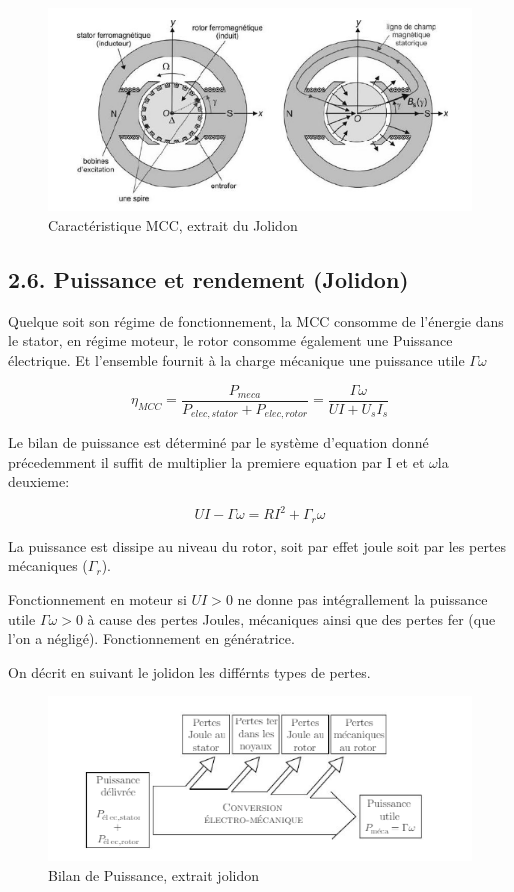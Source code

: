 \documentclass[french, a4paper, 10pt, twocolumn, landscape]{article}
\begin{document}
\begin{figure}[ht]
	\centering
  \includegraphics[width=.5\linewidth]{./figures/MCC.png}
	\caption{Caractéristique MCC, extrait du Jolidon}
\end{figure}


\subsection*{2.6. Puissance et rendement (Jolidon)}

Quelque soit son régime de fonctionnement, la MCC consomme de l'énergie dans le stator, en régime moteur, le rotor consomme également une Puissance électrique. Et l'ensemble fournit à la charge mécanique une puissance utile $\Gamma\omega$




\begin{equation}
	\eta_{MCC} = \dfrac{P_{meca}}{P_{elec, stator}+P_{elec,rotor}}
=\dfrac{\Gamma\omega}{UI+U_sI_s}\end{equation}


Le bilan de puissance est déterminé par le système d'equation donné précedemment il suffit de multiplier la premiere equation par I et et $\omega$la deuxieme: 


\begin{equation}
	UI-\Gamma\omega = RI^2+\Gamma_r\omega
\end{equation}

La puissance est dissipe au niveau du rotor, soit par effet joule soit par les pertes mécaniques ($\Gamma_r$). 

Fonctionnement en moteur si $UI>0$ ne donne pas intégrallement la puissance utile $\Gamma\omega>0$ à cause des pertes Joules, mécaniques ainsi que des pertes fer (que l'on a négligé). Fonctionnement en génératrice.

On décrit en suivant le jolidon les différnts types de pertes.

\begin{figure}[ht]
	\centering
	\includegraphics[width=1\linewidth]{./figures/BillanPuissance.png}
	\caption{Bilan de Puissance, extrait jolidon}
\end{figure}
\end{document}
